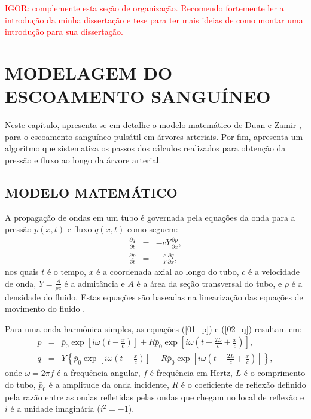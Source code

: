 \documentclass[
        english,			
        brazil			        %
        ,<...>]{abntbibufjf}
\begin{document}
\textcolor{red}{IGOR: complemente esta seção de organização. Recomendo fortemente ler a introdução da minha dissertação e tese para ter mais ideias de como montar uma introdução para sua dissertação.}

\chapter{MODELAGEM DO ESCOAMENTO SANGUÍNEO}\label{sec:modelagem_escoamento}


Neste capítulo, apresenta-se em detalhe o modelo matemático de Duan e Zamir \cite{Duan}, para o escoamento sanguíneo pulsátil em árvores arteriais. Por fim, apresenta um algoritmo que sistematiza os passos dos cálculos realizados para obtenção da pressão e fluxo ao longo da árvore arterial.

\section{MODELO MATEMÁTICO}\label{sec:modelo_matematico}

A propagação de ondas em um tubo é governada pela equações da onda para a pressão $p(x,t)$ e fluxo $q(x,t)$ como seguem:
\begin{eqnarray}
\frac{\partial q}{\partial t} &=& -cY \frac{\partial p}{\partial x},
\label{01_p}\\
\frac{\partial p}{\partial t} &=& -\frac{c}{Y} \frac{\partial q}{\partial x}, 
\label{02_q}
\end{eqnarray}
nos quais $t$ é o tempo, $x$ é a coordenada axial ao longo do tubo, $c$ é a velocidade de onda, $Y = \frac{A}{\rho c}$ é a admitância e $A$ é a área da seção transversal do tubo, e $\rho$ é a densidade do fluido. Estas equações são baseadas na linearização das equações de movimento do fluido \cite{Fung,Lighthill}. 

Para uma onda harmônica simples, as equações (\ref{01_p}) e (\ref{02_q}) resultam em:
\begin{eqnarray}
p &=& \bar{p}_0 \exp\left[i\omega\left(t - \frac{x}{c}\right)\right] + R  \bar{p}_0 \exp\left[i\omega\left(t - \frac{2L}{c} + \frac{x}{c}\right)\right],
\label{03_p}\\
q &=& Y\left\{\bar{p}_0 \exp\left[i\omega\left(t - \frac{x}{c}\right)\right] -  R  \bar{p}_0 \exp\left[i\omega\left(t - \frac{2L}{c} + \frac{x}{c}\right)\right]\right\},
\label{04_1}
\end{eqnarray}
onde $\omega = 2 \pi f$ é a frequência angular, $f$ é frequência em Hertz, $L$ é o comprimento do tubo, $\bar{p}_0$ é a amplitude da onda incidente, $R$ é o coeficiente de reflexão definido pela razão entre as ondas refletidas pelas ondas que chegam no local de reflexão \cite{Fung,Karreman} e $i$ é a unidade imaginária ($i^2 = -1$).
\end{document}
